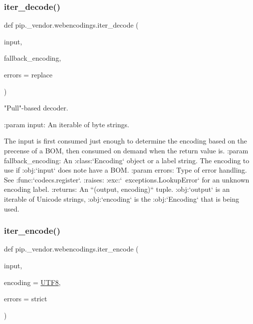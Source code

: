 \subsubsection{\texorpdfstring{iter\+\_\+decode()}{iter\_decode()}}
{\footnotesize\ttfamily def pip.\+\_\+vendor.\+webencodings.\+iter\+\_\+decode (\begin{DoxyParamCaption}\item[{}]{input,  }\item[{}]{fallback\+\_\+encoding,  }\item[{}]{errors = {\ttfamily \textquotesingle{}replace\textquotesingle{}} }\end{DoxyParamCaption})}

\begin{DoxyVerb}"Pull"-based decoder.

:param input:
    An iterable of byte strings.

    The input is first consumed just enough to determine the encoding
    based on the precense of a BOM,
    then consumed on demand when the return value is.
:param fallback_encoding:
    An :class:`Encoding` object or a label string.
    The encoding to use if :obj:`input` does note have a BOM.
:param errors: Type of error handling. See :func:`codecs.register`.
:raises: :exc:`~exceptions.LookupError` for an unknown encoding label.
:returns:
    An ``(output, encoding)`` tuple.
    :obj:`output` is an iterable of Unicode strings,
    :obj:`encoding` is the :obj:`Encoding` that is being used.\end{DoxyVerb}
 \mbox{\label{namespacepip_1_1__vendor_1_1webencodings_aa5411167f6851dbd04d5813b7da22380}} 
\subsubsection{\texorpdfstring{iter\+\_\+encode()}{iter\_encode()}}
{\footnotesize\ttfamily def pip.\+\_\+vendor.\+webencodings.\+iter\+\_\+encode (\begin{DoxyParamCaption}\item[{}]{input,  }\item[{}]{encoding = {\ttfamily \hyperlink{namespacepip_1_1__vendor_1_1webencodings_a2eb014d3f6305ba50ece3cad231b60bf}{U\+T\+F8}},  }\item[{}]{errors = {\ttfamily \textquotesingle{}strict\textquotesingle{}} }\end{DoxyParamCaption})}

